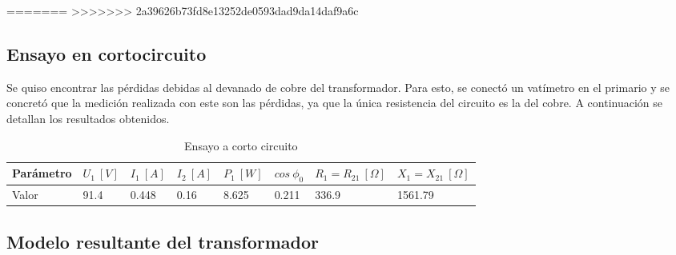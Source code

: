 \documentclass[a4paper]{article}
\begin{document}
=======
>>>>>>> 2a39626b73fd8e13252de0593dad9da14daf9a6c
\subsection{Ensayo en cortocircuito}
Se quiso encontrar las pérdidas debidas al devanado de cobre del transformador. Para esto, se conectó un vatímetro en el primario y se concretó que la medición realizada con este son las pérdidas, ya que la única resistencia del circuito es la del cobre. A continuación se detallan los resultados obtenidos.
\begin{table}[H]
\centering
\begin{tabular}{|l|l|l|l|l|l|l|l|}
\hline
Parámetro & $U_1 \ [V]$ & $I_1 \ [A]$ & $I_2 \ [A]$ & $P_1 \ [W]$ & $cos \ \phi_0 $  & $R_1 = R_21 \ [\Omega] $ & $X_1 = X_{21} \ [\Omega] $\\ \hline
Valor     & 91.4     & 0.448    & 0.16     & 8.625    & 0.211            & 336.9               & 1561.79             \\ \hline
\end{tabular}
\caption {Ensayo a corto circuito}
\centering
\end{table}
\subsection{Modelo resultante del transformador}
\end{document}
